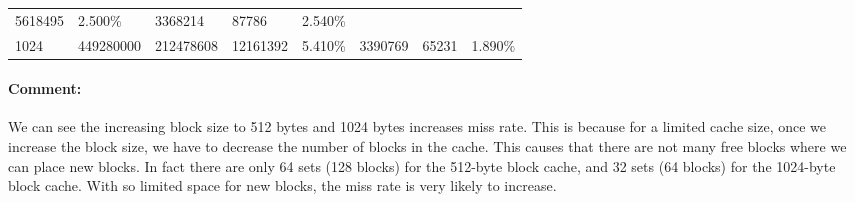 \documentclass[11pt]{article}
\begin{document}
\begin{longtable}[]{@{}llllllll@{}}
\begin{minipage}[t]{0.09\columnwidth}
5618495\strut
\end{minipage} & \begin{minipage}[t]{0.09\columnwidth}\raggedright\strut
2.500\%\strut
\end{minipage} & \begin{minipage}[t]{0.09\columnwidth}\raggedright\strut
3368214\strut
\end{minipage} & \begin{minipage}[t]{0.10\columnwidth}\raggedright\strut
87786\strut
\end{minipage} & \begin{minipage}[t]{0.10\columnwidth}\raggedright\strut
2.540\%\strut
\end{minipage}\tabularnewline
\begin{minipage}[t]{0.14\columnwidth}\raggedright\strut
1024\strut
\end{minipage} & \begin{minipage}[t]{0.10\columnwidth}\raggedright\strut
449280000\strut
\end{minipage} & \begin{minipage}[t]{0.08\columnwidth}\raggedright\strut
212478608\strut
\end{minipage} & \begin{minipage}[t]{0.09\columnwidth}\raggedright\strut
12161392\strut
\end{minipage} & \begin{minipage}[t]{0.09\columnwidth}\raggedright\strut
5.410\%\strut
\end{minipage} & \begin{minipage}[t]{0.09\columnwidth}\raggedright\strut
3390769\strut
\end{minipage} & \begin{minipage}[t]{0.10\columnwidth}\raggedright\strut
65231\strut
\end{minipage} & \begin{minipage}[t]{0.10\columnwidth}\raggedright\strut
1.890\%\strut
\end{minipage}\tabularnewline
\bottomrule
\end{longtable}

\paragraph{Comment:}\label{comment}

We can see the increasing block size to 512 bytes and 1024 bytes
increases miss rate. This is because for a limited cache size, once we
increase the block size, we have to decrease the number of blocks in the
cache. This causes that there are not many free blocks where we can
place new blocks. In fact there are only 64 sets (128 blocks) for the
512-byte block cache, and 32 sets (64 blocks) for the 1024-byte block
cache. With so limited space for new blocks, the miss rate is very
likely to increase.
\end{document}
